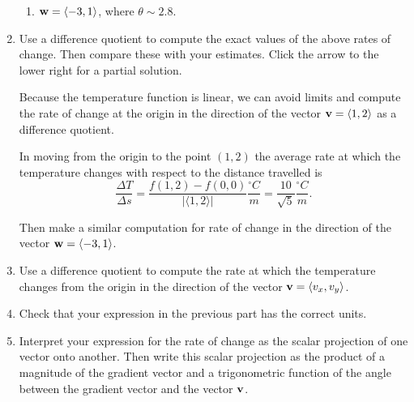 \documentclass{ximera}
\begin{document}
\begin{question}
\begin{enumerate}
\begin{enumerate}
\item ${\bf w} = \langle -3,1\rangle$, where $\theta \sim 2.8$.

\end{enumerate}

\item Use a  difference quotient to compute the exact values of the above rates of change. Then compare these with your estimates. Click the arrow to the lower right for a partial solution.

\begin{expandable}
Because the temperature function is linear, we can avoid limits and compute the rate of change at the origin in the direction of the vector ${\bf v} = \langle 1, 2\rangle$ as a difference quotient.

In moving from the origin to the point $(1,2)$ the average rate at which the temperature changes with respect to the distance travelled is
\[
   \frac{\Delta T}{\Delta s} = \frac{f(1,2) - f(0,0)}{|\langle 1, 2 \rangle|}\frac{^\circ C}{m} = \frac{10}{\sqrt{5}}\frac{^\circ C}{m} .
\]

Then make a similar computation for rate of change in the direction of the vector ${\bf w} = \langle -3,1\rangle$.
\end{expandable}


\item Use a difference quotient to compute the rate  at which the temperature changes from the origin in the direction of the vector ${\bf v}=\langle v_x , v_y \rangle$. 

\item Check that your expression in the previous part has the correct units.

\item Interpret your expression for the rate of change as the scalar projection of one vector onto another. Then write this scalar projection as the product of a magnitude of the gradient vector and a trigonometric function of the angle between the gradient vector and the vector ${\bf v}$.



\end{enumerate}
\end{question}
\end{document}
